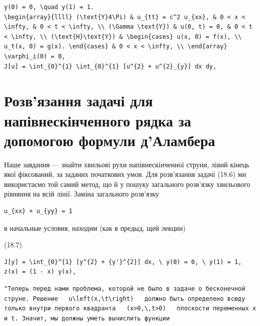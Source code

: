 \documentclass[
  ukrainian,
]{article}
\begin{document}
\begin{verbatim}
y(0) = 0, \quad y(1) = 1.
\begin{array}{llll} (\text{Y}4\Pi) & u_{tt} = c^2 u_{xx}, & 0 < x < \infty, & 0 < t < \infty, \\ (\Gamma \text{Y}) & u(0, t) = 0, & 0 < t < \infty, \\ (\text{H}\text{Y}) & \begin{cases} u(x, 0) = f(x), \\ u_t(x, 0) = g(x). \end{cases} & 0 < x < \infty, \\ \end{array}
\varphi_i(0) = 0,
J[u] = \int_{0}^{1} \int_{0}^{1} [u^{2} + u^{2}_{y}] dx dy,
\end{verbatim}

\section{Розв'язання задачі для напівнескінченного рядка за допомогою
формули
д'Аламбера}\label{ux440ux43eux437ux432ux44fux437ux430ux43dux43dux44f-ux437ux430ux434ux430ux447ux456-ux434ux43bux44f-ux43dux430ux43fux456ux432ux43dux435ux441ux43aux456ux43dux447ux435ux43dux43dux43eux433ux43e-ux440ux44fux434ux43aux430-ux437ux430-ux434ux43eux43fux43eux43cux43eux433ux43eux44e-ux444ux43eux440ux43cux443ux43bux438-ux434ux430ux43bux430ux43cux431ux435ux440ux430}

Наше завдання --- знайти хвильові рухи напівнескінченної струни, лівий
кінець якої фіксований, за заданих початкових умов. Для розв'язання
задачі (18.6) ми використаємо той самий метод, що й у пошуку загального
розв'язку хвильового рівняння на всій лінії. Заміна загального розв'язку

\begin{verbatim}
u_{xx} + u_{yy} = 1
\end{verbatim}

в начальные условия, находим (как в предыд, щей лекции)

(18.7)

\begin{verbatim}
J[y] = \int_{0}^{1} [y^{2} + {y'}^{2}] dx, \ y(0) = 0, \ y(1) = 1,
z(x) = (1 - x) y(x),
\end{verbatim}

\begin{verbatim}
"Теперь перед нами проблема, которой не было в задаче о бесконечной струне. Решение   u\left(x,\t\right)   должно быть определено всюду только внутри первого квадранта   (x>0,\,t>0)   плоскости переменных x и t. Значит, мы должны уметь вычислить функции
\end{verbatim}
\end{document}
